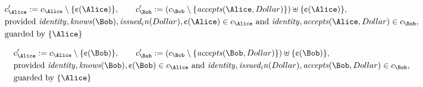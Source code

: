 \begin{align*}
&
c'_
{
\Alice
}
 := 
c_
{
\Alice
}
 \setminus 
\{
\text{\textcent}
(
\Alice
)
\}
, \qquad 
c'_
{
\Bob
}
 := 
(c_
{
\Bob
}
 \setminus 
\{
\mathit{
accepts
}
(
\Alice
,
Dollar
)
\}
) \uplus 
\{
\text{\textcent}
(
\Alice
)
\}
,\\
&
\text{provided } 
\mathit{
identity
}
,
\mathit{
knows
}
(
\Bob
)
,
\mathit{
issued_in
}
(
Dollar
)
,
\text{\textcent}
(
\Alice
)
 \in c_
{
\Alice
}
 \text{ and } 
\mathit{
identity
}
,
\mathit{
accepts
}
(
\Alice
,
Dollar
)
 \in c_
{
\Bob
}
,\\
&
\text{guarded by } \{
\Alice
\}
\end{align*}

\begin{align*}
&
c'_
{
\Alice
}
 := 
c_
{
\Alice
}
 \setminus 
\{
\text{\textcent}
(
\Bob
)
\}
, \qquad 
c'_
{
\Bob
}
 := 
(c_
{
\Bob
}
 \setminus 
\{
\mathit{
accepts
}
(
\Bob
,
Dollar
)
\}
) \uplus 
\{
\text{\textcent}
(
\Bob
)
\}
,\\
&
\text{provided } 
\mathit{
identity
}
,
\mathit{
knows
}
(
\Bob
)
,
\text{\textcent}
(
\Bob
)
 \in c_
{
\Alice
}
 \text{ and } 
\mathit{
identity
}
,
\mathit{
issued_in
}
(
Dollar
)
,
\mathit{
accepts
}
(
\Bob
,
Dollar
)
 \in c_
{
\Bob
}
,\\
&
\text{guarded by } \{
\Alice
\}
\end{align*}

